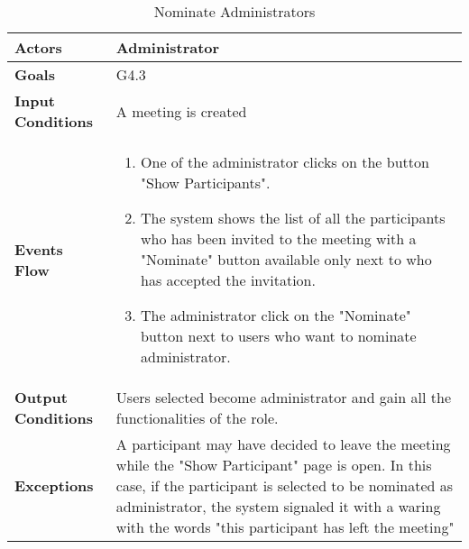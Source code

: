 \begin{table}[H]
	\centering
	\def\arraystretch{1.5}
	\begin{tabular}{|p{7cm}|p{7cm}|}
		\hline
		\textbf{Actors}            & Administrator    \\ \hline
		\textbf{Goals}             & G4.3           \\ \hline
		\textbf{Input Conditions}  & A meeting is created           \\ \hline
		\textbf{Events Flow}       &  
		\begin{enumerate}[topsep=0pt, leftmargin=*]
			\item One of the administrator clicks on the button "Show Participants".
			\item The system shows the list of all the participants who has been invited to the meeting with a "Nominate" button available only next to who has accepted the invitation.
			\item The administrator click on the "Nominate" button next to users who want to nominate administrator.
		\end{enumerate}             \\ \hline
		\textbf{Output Conditions} & Users selected become administrator and gain all the functionalities of the role.           \\ \hline
		\textbf{Exceptions}        & A participant may have decided to leave the meeting while the "Show Participant" page is open. In this case, if the participant is selected to be nominated as administrator, the system signaled it with a waring with the words "this participant has left the meeting"      \\ \hline
	\end{tabular}
	\caption{Nominate Administrators}
\end{table}


